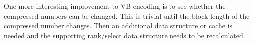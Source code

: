 One more interesting improvement to VB encoding is to see whether the compressed numbers can be changed. This is trivial until the block length of the compressed number changes. Then an additional data structure or 
cache is needed and the supporting rank/select data structure needs to be recalculated.


